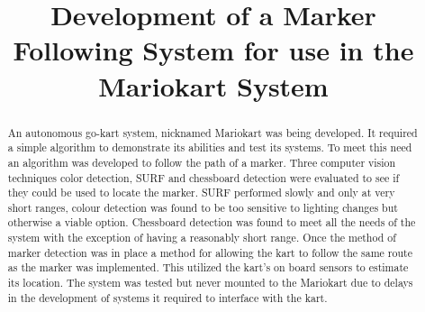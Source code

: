 \title{Development of a Marker Following System for use in the Mariokart System}

\author{

  \vspace{0.5\baselineskip}


  \vspace{0.5\baselineskip}

}

\maketitle

\begin{abstract}
  An autonomous go-kart system, nicknamed Mariokart was being developed. It required a simple algorithm to demonstrate its abilities and test its systems. To meet this need an algorithm was developed to follow the path of a marker. Three computer vision techniques color detection, SURF and chessboard detection were evaluated to see if they could be used to locate the marker. SURF performed slowly and only at very short ranges, colour detection was found to be too sensitive to lighting changes but otherwise a viable option. Chessboard detection was found to meet all the needs of the system with the exception of having a reasonably short range. Once the method of marker detection was in place a method for allowing the kart to follow the same route as the marker was implemented. This utilized the kart’s on board sensors to estimate its location. The system was tested but never mounted to the Mariokart due to delays in the development of systems it required to interface with the kart.
\end{abstract}
